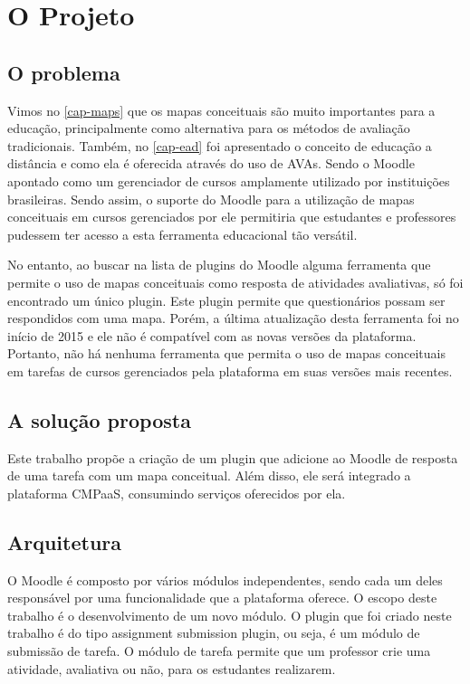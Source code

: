 \documentclass[
	12pt,				%
	openright,			%
	oneside,			%
	a4paper,			%
	english,			%
	french,				%
	spanish,			%
	brazil				%
	]{abntex2}
\begin{document}
 

\chapter{O Projeto}\label{cap-projeto}

\section{O problema}

Vimos no \autoref{cap-maps} que os mapas conceituais são muito importantes para a educação, principalmente como alternativa para os métodos de avaliação tradicionais. Também, no \autoref{cap-ead} foi apresentado o conceito de educação a distância e como ela é oferecida através do uso de AVAs. Sendo o Moodle apontado como um gerenciador de cursos amplamente utilizado por instituições brasileiras. Sendo assim, o suporte do Moodle para a utilização de mapas conceituais em cursos gerenciados por ele permitiria que estudantes e professores pudessem ter acesso a esta ferramenta educacional tão versátil.    

No entanto, ao buscar na lista de plugins do Moodle alguma ferramenta que permite o uso de mapas conceituais como resposta de atividades avaliativas, só foi encontrado um único plugin. Este plugin permite que questionários possam ser respondidos com uma mapa. Porém, a última atualização desta ferramenta foi no início de 2015 e ele não é compatível com as novas versões da plataforma. Portanto, não há nenhuma ferramenta que permita o uso de mapas conceituais em tarefas de cursos gerenciados pela plataforma em suas versões mais recentes.


\section{A solução proposta}

Este trabalho propõe a criação de um plugin que adicione ao Moodle de resposta de uma tarefa com um mapa conceitual. Além disso, ele será integrado a plataforma CMPaaS, consumindo serviços oferecidos por ela.

\section{Arquitetura}

O Moodle é composto por vários módulos independentes, sendo cada um deles responsável por uma funcionalidade que a plataforma oferece. O escopo deste trabalho é o desenvolvimento de um novo módulo. O plugin que foi criado neste trabalho é do tipo assignment submission plugin, ou seja, é um módulo de submissão de tarefa. O módulo de tarefa permite que um professor crie uma atividade, avaliativa ou não, para os estudantes realizarem.
\end{document}
